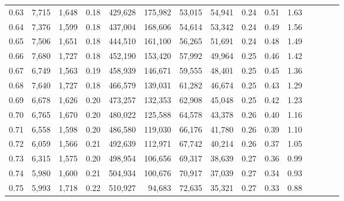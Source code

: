 \begin{tabular}{rrrcrrrrrrrrrrr}
0.63 &   7,715 &  1,648 &                                       0.18 &  429,628 &  175,982 &   53,015 &   54,941 &  0.24 &  0.51 &                         1.63 \\
0.64 &   7,376 &  1,599 &                                       0.18 &  437,004 &  168,606 &   54,614 &   53,342 &  0.24 &  0.49 &                         1.56 \\
0.65 &   7,506 &  1,651 &                                       0.18 &  444,510 &  161,100 &   56,265 &   51,691 &  0.24 &  0.48 &                         1.49 \\
0.66 &   7,680 &  1,727 &                                       0.18 &  452,190 &  153,420 &   57,992 &   49,964 &  0.25 &  0.46 &                         1.42 \\
0.67 &   6,749 &  1,563 &                                       0.19 &  458,939 &  146,671 &   59,555 &   48,401 &  0.25 &  0.45 &                         1.36 \\
0.68 &   7,640 &  1,727 &                                       0.18 &  466,579 &  139,031 &   61,282 &   46,674 &  0.25 &  0.43 &                         1.29 \\
0.69 &   6,678 &  1,626 &                                       0.20 &  473,257 &  132,353 &   62,908 &   45,048 &  0.25 &  0.42 &                         1.23 \\
0.70 &   6,765 &  1,670 &                                       0.20 &  480,022 &  125,588 &   64,578 &   43,378 &  0.26 &  0.40 &                         1.16 \\
0.71 &   6,558 &  1,598 &                                       0.20 &  486,580 &  119,030 &   66,176 &   41,780 &  0.26 &  0.39 &                         1.10 \\
0.72 &   6,059 &  1,566 &                                       0.21 &  492,639 &  112,971 &   67,742 &   40,214 &  0.26 &  0.37 &                         1.05 \\
0.73 &   6,315 &  1,575 &                                       0.20 &  498,954 &  106,656 &   69,317 &   38,639 &  0.27 &  0.36 &                         0.99 \\
0.74 &   5,980 &  1,600 &                                       0.21 &  504,934 &  100,676 &   70,917 &   37,039 &  0.27 &  0.34 &                         0.93 \\
0.75 &   5,993 &  1,718 &                                       0.22 &  510,927 &   94,683 &   72,635 &   35,321 &  0.27 &  0.33 &                         0.88 \\

\end{tabular}
